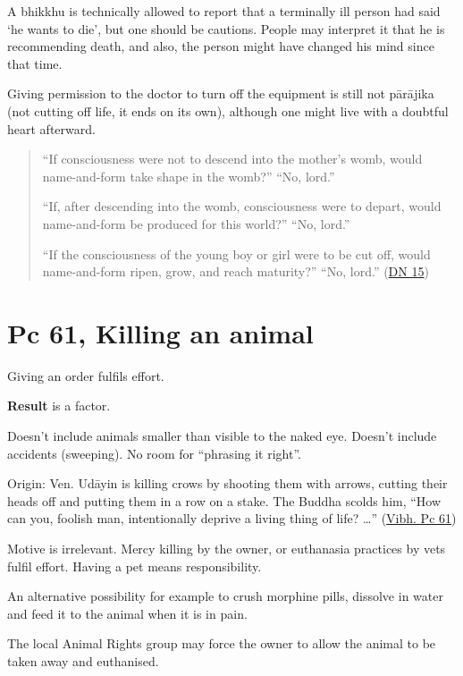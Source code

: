 A bhikkhu is technically allowed to report that a terminally ill person
had said `he wants to die', but one should be cautions. People may
interpret it that he is recommending death, and also, the person might
have changed his mind since that time.

Giving permission to the doctor to turn off the equipment is still not
pārājika (not cutting off life, it ends on its own), although one might
live with a doubtful heart afterward.

\begin{quote}
``If consciousness were not to descend into the mother's womb, would
name-and-form take shape in the womb?'' ``No, lord.''

``If, after descending into the womb, consciousness were to depart,
would name-and-form be produced for this world?'' ``No, lord.''

``If the consciousness of the young boy or girl were to be cut off,
would name-and-form ripen, grow, and reach maturity?'' ``No, lord.''
(\href{https://www.accesstoinsight.org/tipitaka/dn/dn.15.0.than.html}{DN
15})
\end{quote}

\section{Pc 61, Killing an animal}

Giving an order fulfils effort.

\textbf{Result} is a factor.

Doesn't include animals smaller than visible to the naked eye. Doesn't
include accidents (sweeping). No room for ``phrasing it right''.

Origin: Ven. Udāyin is killing crows by shooting them with arrows,
cutting their heads off and putting them in a row on a stake. The Buddha
scolds him, ``How can you, foolish man, intentionally deprive a living
thing of life? \ldots{}''
(\href{https://suttacentral.net/pli-tv-bu-vb-pc61/en/horner}{Vibh. Pc
61})

Motive is irrelevant. Mercy killing by the owner, or euthanasia
practices by vets fulfil effort. Having a pet means responsibility.

An alternative possibility for example to crush morphine pills, dissolve
in water and feed it to the animal when it is in pain.

The local Animal Rights group may force the owner to allow the animal to
be taken away and euthanised.

